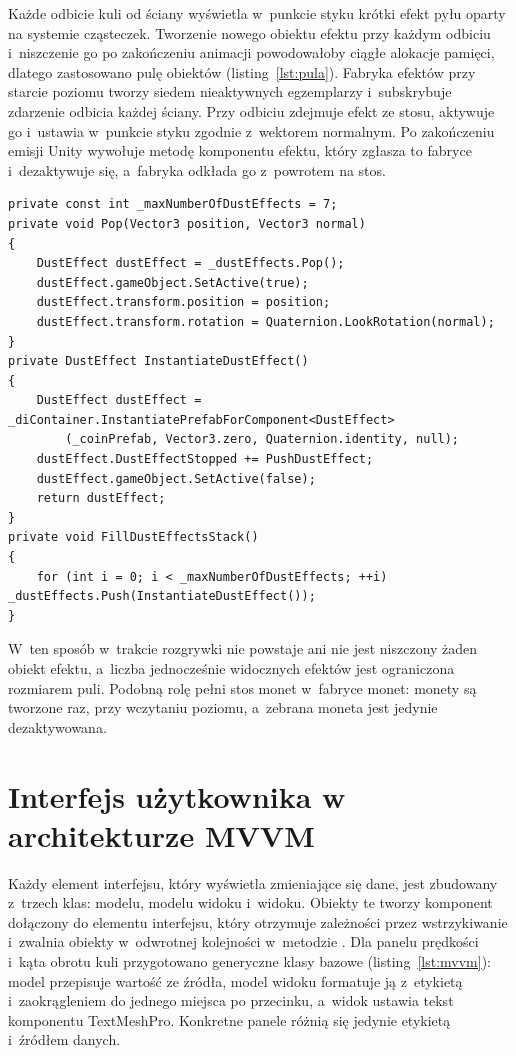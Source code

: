 Każde odbicie kuli od ściany wyświetla w~punkcie styku krótki efekt pyłu oparty na
systemie cząsteczek. Tworzenie nowego obiektu efektu przy każdym odbiciu i~niszczenie go
po zakończeniu animacji powodowałoby ciągłe alokacje pamięci, dlatego zastosowano pulę
obiektów \cite{nystrom-pool} (listing~\ref{lst:pula}). Fabryka efektów przy starcie poziomu tworzy siedem
nieaktywnych egzemplarzy i~subskrybuje zdarzenie odbicia każdej ściany. Przy odbiciu
zdejmuje efekt ze stosu, aktywuje go i~ustawia w~punkcie styku zgodnie z~wektorem
normalnym. Po zakończeniu emisji Unity wywołuje metodę 
komponentu efektu, który zgłasza to fabryce i~dezaktywuje się, a~fabryka odkłada go
z~powrotem na stos.

\begin{lstlisting}[caption={Pula efektów cząsteczkowych w~klasie DustEffectsFactory; \zrodloWlasne},label=lst:pula]
private const int _maxNumberOfDustEffects = 7;
private void Pop(Vector3 position, Vector3 normal)
{
    DustEffect dustEffect = _dustEffects.Pop();
    dustEffect.gameObject.SetActive(true);
    dustEffect.transform.position = position;
    dustEffect.transform.rotation = Quaternion.LookRotation(normal);
}
private DustEffect InstantiateDustEffect()
{
    DustEffect dustEffect = _diContainer.InstantiatePrefabForComponent<DustEffect>
        (_coinPrefab, Vector3.zero, Quaternion.identity, null);
    dustEffect.DustEffectStopped += PushDustEffect;
    dustEffect.gameObject.SetActive(false);
    return dustEffect;
}
private void FillDustEffectsStack()
{
    for (int i = 0; i < _maxNumberOfDustEffects; ++i) _dustEffects.Push(InstantiateDustEffect());
}
\end{lstlisting}

W~ten sposób w~trakcie rozgrywki nie powstaje ani nie jest niszczony żaden obiekt efektu,
a~liczba jednocześnie widocznych efektów jest ograniczona rozmiarem puli. Podobną rolę
pełni stos monet w~fabryce monet: monety są tworzone raz, przy wczytaniu poziomu,
a~zebrana moneta jest jedynie dezaktywowana.

\section{Interfejs użytkownika w architekturze MVVM}

Każdy element interfejsu, który wyświetla zmieniające się dane, jest zbudowany z~trzech
klas: modelu, modelu widoku i~widoku. Obiekty te tworzy komponent 
dołączony do elementu interfejsu, który otrzymuje zależności przez wstrzykiwanie
i~zwalnia obiekty w~odwrotnej kolejności w~metodzie . Dla panelu prędkości
i~kąta obrotu kuli przygotowano generyczne klasy bazowe (listing~\ref{lst:mvvm}): model
przepisuje wartość ze źródła, model widoku formatuje ją z~etykietą i~zaokrągleniem do
jednego miejsca po przecinku, a~widok ustawia tekst komponentu TextMeshPro. Konkretne
panele różnią się jedynie etykietą i~źródłem danych.

